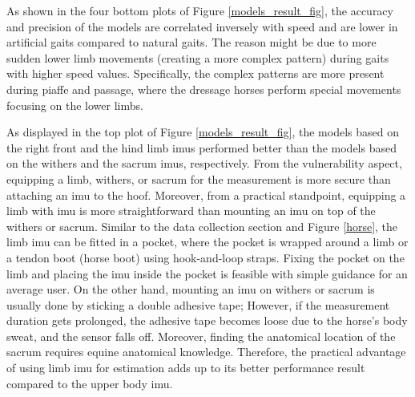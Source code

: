 
As shown in the four bottom plots of Figure \ref{models_result_fig}, the accuracy and precision of the models are correlated inversely with speed and are lower in artificial gaits compared to natural gaits. The reason might be due to more sudden lower limb movements (creating a more complex pattern) during gaits with higher speed values. Specifically, the complex patterns are more present during piaffe and passage, where the dressage horses perform special movements focusing on the lower limbs.

As displayed in the top plot of Figure \ref{models_result_fig}, the models based on the right front and the hind limb \gls{imu}s performed better than the models based on the withers and the sacrum \gls{imu}s, respectively. From the vulnerability aspect, equipping a limb, withers, or sacrum for the measurement is more secure than attaching an \gls{imu} to the hoof. Moreover, from a practical standpoint, equipping a limb with \gls{imu} is more straightforward than mounting an \gls{imu} on top of the withers or sacrum. Similar to the data collection section and Figure \ref{horse}, the limb \gls{imu} can be fitted in a pocket, where the pocket is wrapped around a limb or a tendon boot (horse boot) using hook-and-loop straps. Fixing the pocket on the limb and placing the \gls{imu} inside the pocket is feasible with simple guidance for an average user. On the other hand, mounting an \gls{imu} on withers or sacrum is usually done by sticking a double adhesive tape; However, if the measurement duration gets prolonged, the adhesive tape becomes loose due to the horse's body sweat, and the sensor falls off. Moreover, finding the anatomical location of the sacrum requires equine anatomical knowledge. Therefore, the practical advantage of using limb \gls{imu} for estimation adds up to its better performance result compared to the upper body \gls{imu}. %


